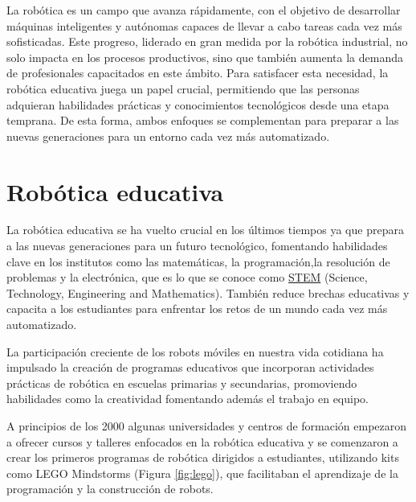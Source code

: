 La robótica es un campo que avanza rápidamente, con el objetivo de desarrollar máquinas inteligentes y autónomas capaces de llevar a cabo tareas cada vez más sofisticadas. Este progreso, liderado en gran medida por la robótica industrial, no solo impacta en los procesos productivos, sino que también aumenta la demanda de profesionales capacitados en este ámbito. Para satisfacer esta necesidad, la robótica educativa juega un papel crucial, permitiendo que las personas adquieran habilidades prácticas y conocimientos tecnológicos desde una etapa temprana. De esta forma, ambos enfoques se complementan para preparar a las nuevas generaciones para un entorno cada vez más automatizado.


\section{Robótica educativa}
\label{sec:terceraseccion}


La robótica educativa se ha vuelto crucial en los últimos tiempos ya que prepara a las nuevas generaciones para un futuro tecnológico, fomentando habilidades clave en los institutos como las matemáticas, la programación,la resolución de problemas y la electrónica, que es lo que se conoce como \hyperlink{STEM}{STEM} (Science, Technology, Engineering and Mathematics). También reduce brechas educativas y capacita a los estudiantes para enfrentar los retos de un mundo cada vez más automatizado.

La participación creciente de los robots móviles en nuestra vida cotidiana ha impulsado la creación de programas educativos que incorporan actividades prácticas de robótica en escuelas primarias y secundarias, promoviendo habilidades como la creatividad fomentando además el trabajo en equipo.


A principios de los 2000 algunas universidades y centros de formación empezaron a ofrecer cursos y talleres enfocados en la robótica educativa y se comenzaron a crear los primeros programas de robótica dirigidos a estudiantes, utilizando kits como LEGO Mindstorms (Figura \ref{fig:lego}), que facilitaban el aprendizaje de la programación y la construcción de robots.

